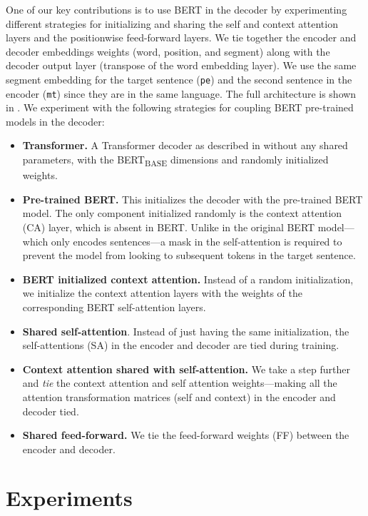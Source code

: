One of our key contributions is to use BERT in the decoder by
experimenting different strategies for initializing and sharing the
self and context attention layers and the positionwise feed-forward
layers. We tie together the encoder and decoder embeddings weights
(word, position, and segment) along with the decoder output layer
(transpose of the word embedding layer). We use the same segment
embedding for the target sentence ({\tt pe}) and the second sentence
in the encoder ({\tt mt}) since they are in the same language. The
full architecture is shown in .
We experiment with the following strategies for coupling BERT
pre-trained models in the decoder:

\begin{itemize}
  \item \textbf{Transformer.} A Transformer decoder as described in
        \citet{vaswani2017attention} without any shared parameters,
        with the BERT\textsubscript{BASE} dimensions and randomly
        initialized weights.
  \item \textbf{Pre-trained BERT.} This initializes the decoder with
        the pre-trained BERT model. The only component initialized randomly
        is the context attention (CA) layer, which is absent in BERT. Unlike
        in the original BERT model---which only encodes sentences---a mask in
        the self-attention is required to prevent the model from looking to
        subsequent tokens in the target sentence.
  \item \textbf{ BERT initialized context attention.} Instead of a
        random initialization, we initialize the context attention layers
        with the weights of the corresponding BERT self-attention layers.
  \item \textbf{Shared self-attention}. Instead of just having the same
        initialization, the self-attentions (SA) in the encoder and decoder
        are tied during training.
  \item \textbf{Context attention shared with self-attention.} We take
        a step further and \emph{tie} the context attention and self
        attention weights---making all the attention transformation matrices
        (self and context) in the encoder and decoder tied.
  \item \textbf{Shared feed-forward.} We tie the feed-forward weights
        (FF) between the encoder and decoder.
\end{itemize}

\section{Experiments} \label{sec:experiments}

